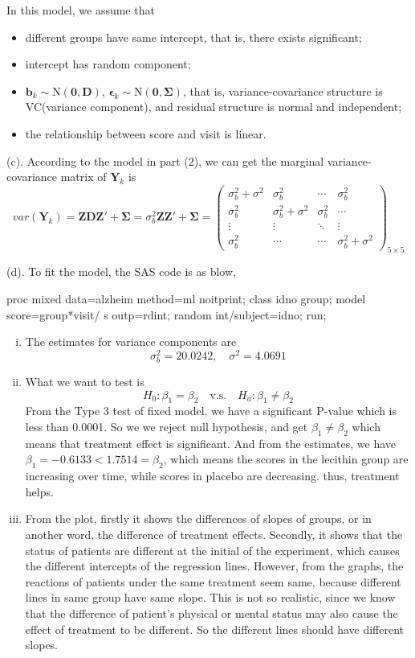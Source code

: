 \documentclass[letterpaper, 12pt]{article}
\newcommand{\lma}{\left(\begin{matrix}}
\newcommand{\rma}{\end{matrix}\right)}
\begin{document}
In this model, we assume that
\begin{itemize}
\item different groups have same intercept, that is, there exists significant;
\item intercept has random component;
\item $\bm{b}_k\sim\text{N}(\bm{0},\bm{D})$, $\bm{\epsilon}_k\sim\text{N}(\bm{0},\bm{\Sigma})$, that is, variance-covariance structure is VC(variance component), and residual structure is normal and independent;
\item the relationship between score and visit is linear.
\end{itemize}


(c). According to the model in part (2), we can get the marginal variance-covariance matrix of $\bm{Y}_k$ is 
$$
var(\bm{Y}_k)=\bm{ZDZ}'+\bm{\Sigma}=\sigma_b^2\bm{ZZ}'+\bm{\Sigma}=\lma
\sigma^2_b+\sigma^2&\sigma^2_b&\cdots&\sigma^2_b\\
\sigma^2_b&\sigma^2_b+\sigma^2&\sigma^2_b&\cdots\\
\vdots&\vdots&\ddots&\vdots\\
\sigma^2_b&\cdots&\cdots&\sigma^2_b+\sigma^2\rma_{5\times 5}
$$


(d). To fit the model, the SAS code is as blow,
\begin{Sascode}[store=class]
proc mixed data=alzheim method=ml noitprint;
class idno group;
model score=group*visit/ s outp=rdint;
random int/subject=idno;
run;
\end{Sascode}

\begin{enumerate}[i.]
\item The estimates for variance components are
$$
\sigma_{b}^2=20.0242,\quad \sigma^2=4.0691
$$

\item What we want to test is
$$
H_0:\beta_1=\beta_2\quad\text{v.s.}\quad H_a: \beta_1\not=\beta_2
$$
From the Type 3 test of fixed model, we have a significant P-value which is less than 0.0001. So we we reject null hypothesis, and get $\beta_1\not=\beta_2$ which means that treatment effect is significant. And from the estimates, we have $\beta_1=-0.6133<1.7514=\beta_2$, which means the scores in the lecithin group are increasing over time, while scores in placebo are decreasing. thus, treatment helps.

\item From the plot, firstly it shows the differences of slopes of groups, or in another word, the difference of treatment effects. Secondly, it shows that the status of patients are different at the initial of the experiment, which causes the different intercepts of the regression lines. However, from the graphs, the reactions of patients under the same treatment seem same, because different lines in same group have same slope. This is not so realistic, since we know that the difference of patient's physical or mental status may also cause the effect of treatment to be different. So the different lines should have different slopes.
\end{enumerate}
\end{document}
